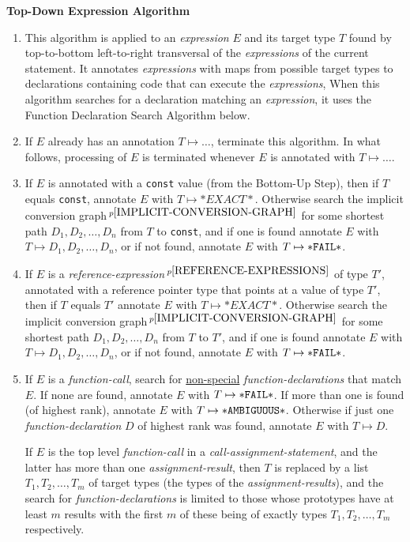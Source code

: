 \documentclass[12pt]{article}
\newcommand{\pagnote}[1]{$\,^{p\pageref{#1}}$}
\begin{document}
\centerline{\bf Top-Down Expression Algorithm}
\begin{enumerate}

\item This algorithm is applied to an {\em expression} $E$ and its
target type $T$ found by
top-to-bottom left-to-right transversal of the {\em expressions} of the
current statement.  It annotates {\em expressions} with maps from
possible target types to declarations containing code that can execute
the {\em expressions},
When this algorithm searches for a declaration matching an {\em expression},
it uses the Function Declaration Search Algorithm below.

\item If $E$ already has an annotation $T\mapsto \ldots$,
terminate this algorithm.  In what follows, processing of $E$ is
terminated whenever $E$ is annotated with $T\mapsto \ldots$.

\item If $E$ is annotated with a {\tt const} value
(from the Bottom-Up Step), then if $T$ equals {\tt const},
annotate $E$ with $T\mapsto{*EXACT*}$.
Otherwise search the implicit conversion
graph\pagnote{IMPLICIT-CONVERSION-GRAPH}
for some shortest path $D_1,D_2,\ldots,D_n$ from $T$ to {\tt const},
and if one is found annotate $E$ with $T\mapsto D_1,D_2,\ldots,D_n$,
or if not found,
annotate $E$ with $T\mapsto {\tt *FAIL*}$.

\item If $E$ is a
{\em reference-expression}\pagnote{REFERENCE-EXPRESSIONS}
of type $T'$,
annotated with a reference pointer type that points at a value
of type $T'$,
then if $T$ equals $T'$ annotate $E$ with $T\mapsto{*EXACT*}$.
Otherwise search the implicit conversion
graph\pagnote{IMPLICIT-CONVERSION-GRAPH}
for some shortest path $D_1,D_2,\ldots,D_n$ from $T$ to $T'$,
and if one is found annotate $E$ with $T\mapsto D_1,D_2,\ldots,D_n$,
or if not found,
annotate $E$ with $T\mapsto {\tt *FAIL*}$.

\item If $E$ is a {\em function-call}, search for \underline{non-special}
{\em function-declarations}
that match $E$.
If none are found,
annotate $E$ with $T\mapsto{\tt *FAIL*}$.
If more than one is found (of highest rank),
annotate $E$ with $T\mapsto{\tt *AMBIGUOUS*}$.
Otherwise if just one {\em function-declaration} $D$ of highest rank was found,
annotate $E$ with $T\mapsto D$.

If $E$ is the top level {\em function-call}
in a {\em call-assignment-statement}, and the latter has
more than one {\em assignment-result}, then $T$ is replaced by a list
$T_1,T_2,\ldots,T_m$ of target types (the types of the
{\em assignment-results}), and the search for
{\em function-declarations} is limited to those whose prototypes have
at least $m$ results with the first $m$ of these being of exactly types
$T_1,T_2,\ldots,T_m$ respectively.

\end{enumerate}
\end{document}
